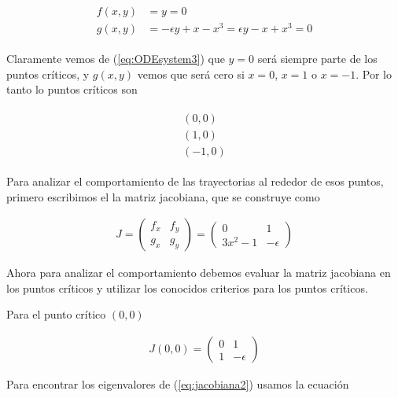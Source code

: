 \documentclass[a4paper,10pt]{article}
\numberwithin{equation}{section}
\begin{document}
\begin{align}
 \begin{split}
  f(x,y) &= y = 0\\
  g(x,y) &= -\epsilon y + x - x^3 = \epsilon y -x + x^3  = 0
 \label{eq:ODEsystem3}
 \end{split}
\end{align}

Claramente vemos de (\ref{eq:ODEsystem3}) que $y=0$ será siempre parte de los puntos críticos,
y $g(x,y)$ vemos que será cero si $x=0$, $x=1$ o $x=-1$. Por lo tanto lo puntos críticos son

\begin{align}
 \begin{split}
  (0,0) \\
  (1,0) \\
  (-1,0) 
 \label{eq:puntoscriticos1}
 \end{split}
\end{align}

Para analizar el comportamiento de las trayectorias al rededor de esos puntos, primero escribimos 
el la matriz jacobiana, que se construye como


\begin{align}
J = \begin{pmatrix}
     f_x & f_y \\
     g_x & g_y
\end{pmatrix} = \begin{pmatrix}
		0 & 1 \\
		3x^2 -1 & -\epsilon
		\end{pmatrix}
\label{eq:jacobiana1}
\end{align}

Ahora para analizar el comportamiento debemos evaluar la matriz jacobiana en los puntos
críticos y utilizar los conocidos criterios para los puntos críticos. 

\vspace{.3cm}

Para el punto crítico $(0,0)$

\begin{align}
J(0,0) = \begin{pmatrix}
     0 & 1 \\
     1 & -\epsilon
\end{pmatrix}
\label{eq:jacobiana2}
\end{align}

Para encontrar los eigenvalores de (\ref{eq:jacobiana2}) usamos la ecuación
\end{document}
